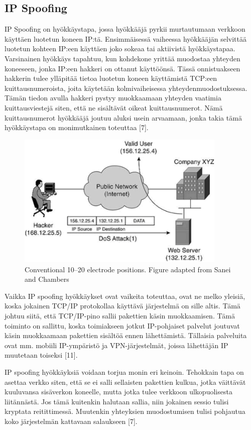 \subsection{IP Spoofing}

IP Spoofing on hyökkäystapa, jossa hyökkääjä pyrkii murtautumaan verkkoon
käyttäen luotetun koneen IP:tä. Ensimmäisessä vaiheessa hyökkääjän selvittää
luotetun kohteen IP:een käyttäen joko sokeaa tai aktiivistä hyökkäystapaa.
Varsinainen hyökkäys tapahtuu, kun kohdekone yrittää muodostaa yhteyden
koneeseen, jonka IP:een hakkeri on ottanut käyttöönsä. Tässä onnistuakseen
hakkerin tulee ylläpitää tietoa luotetun koneen käyttämistä TCP:een
kuittausnumeroista, joita käytetään kolmivaiheisessa yhteydenmuodostuksessa.
Tämän tiedon avulla hakkeri pystyy muokkaamaan yhteyden vaatimia
kuittausviestejä siten, että ne sisältävät oikeat kuittausnumerot. Nämä
kuittausnumerot hyökkääjä joutuu aluksi usein arvaamaan, jonka takia tämä
hyökkäystapa on monimutkainen toteuttaa [7].

\begin{figure}[ht]
\centering
\includegraphics[width=10cm]{pics/spoofing.pdf}
\caption[Conventional electrode positioning]{Conventional 10--20 electrode positions. Figure adapted from Sanei and Chambers}
\label{ELECTRODE_POSITIONS}
\end{figure}

Vaikka IP spoofing hyökkäykset ovat vaikeita toteuttaa, ovat ne melko yleisiä,
koska jokainen TCP/IP protokollaa käyttävä järjestelmä on sille altis. Tämä
johtuu siitä, että TCP/IP-pino sallii pakettien käsin muokkaamisen. Tämä
toiminto on sallittu, koska toimiakseen jotkut IP-pohjaiset palvelut joutuvat
käsin muokkaamaan pakettien sisältöä ennen lähettämistä. Tällaisia palveluita
ovat mm. mobiili IP-ympäristö ja VPN-järjestelmät, joissa lähettäjän IP
muutetaan toiseksi [11].

IP spoofing hyökkäyksiä voidaan torjua monin eri keinoin. Tehokkain tapa on
asettaa verkko siten, että se ei salli sellaisten pakettien kulkua, jotka
väittävät kuuluvansa sisäverkon koneelle, mutta jotka tulee verkkoon
ulkopuolisesta liitännästä. Jos tämä kuitenkin halutaan sallia, niin jokainen
sessio tulisi kryptata reitittimessä. Muutenkin yhteyksien muodostumisen tulisi
pohjautua koko järjestelmän kattavaan salaukseen [7].

